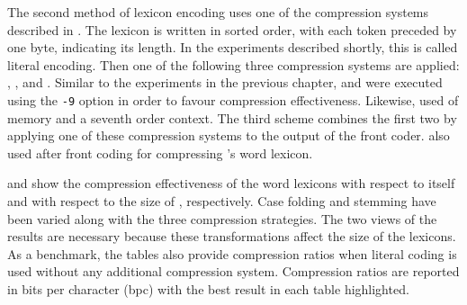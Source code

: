The second method of lexicon encoding uses one of the 
compression systems described in . 
The lexicon is written in sorted order, with each token
preceded by one byte, indicating its length.  In the experiments
described shortly, this is called literal encoding.  Then
one of the following three
compression systems are applied:  \gzip, \bzip, and \ppmd.  
Similar to the experiments in the
previous chapter, \gzip and \bzip were executed using 
the {\texttt {-9}} option in order to favour compression
effectiveness.  Likewise, \ppmd used  of
memory and a seventh order context.  The third scheme 
combines the first two by
applying one of these compression systems to the output of
the front coder.
\citet{nw97:cj} also used \ppm after front coding for
compressing \sequitur's word lexicon.

 and 
 show the
compression effectiveness of the word lexicons with respect to itself
and with respect to the size of \wsja, respectively.  Case folding
and stemming have been varied along with the three compression
strategies.  The two views of the results are necessary because
these transformations affect the size of the lexicons.  As a benchmark,
the tables also provide compression ratios when literal coding is
used without any additional compression system.
Compression ratios are reported in bits per
character (bpc) with the best result in each table highlighted.

